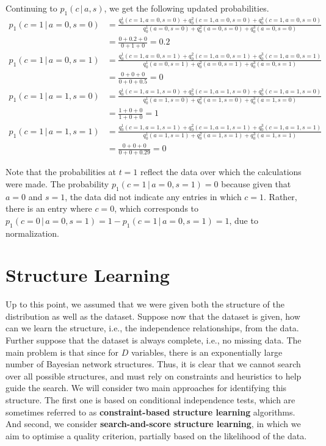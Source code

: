\documentclass{article}
\newcommand{\giv}{\,|\,}
\begin{document}
\noindent Continuing to $p_1(c \giv a, s)$, we get the following updated probabilities. 
\begin{align*}
    p_1(c=1 \giv a=0, s=0) &= \frac{q_0^1(c=1, a=0, s=0) + q_0^2(c=1, a=0, s=0) + q_0^3(c=1, a=0, s=0)}{q_0^1(a=0, s=0) + q_0^2(a=0, s=0) + q_0^3(a=0, s=0)}\\[1em] 
    &= \frac{0 + 0.2 + 0}{0 + 1 + 0} = 0.2\\[1em]
    p_1(c=1 \giv a=0, s=1) &= \frac{q_0^1(c=1, a=0, s=1) + q_0^2(c=1, a=0, s=1) + q_0^3(c=1, a=0, s=1)}{q_0^1(a=0, s=1) + q_0^2(a=0, s=1) + q_0^3(a=0, s=1)}\\[1em] 
    &= \frac{0 + 0 + 0}{0 + 0 + 0.5} = 0\\[1em]
    p_1(c=1 \giv a=1, s=0) &= \frac{q_0^1(c=1, a=1, s=0) + q_0^2(c=1, a=1, s=0) + q_0^3(c=1, a=1, s=0)}{q_0^1(a=1, s=0) + q_0^2(a=1, s=0) + q_0^3(a=1, s=0)}\\[1em] 
    &= \frac{1 + 0 + 0}{1 + 0 + 0} = 1\\[1em]
    p_1(c=1 \giv a=1, s=1) &= \frac{q_0^1(c=1, a=1, s=1) + q_0^2(c=1, a=1, s=1) + q_0^3(c=1, a=1, s=1)}{q_0^1(a=1, s=1) + q_0^2(a=1, s=1) + q_0^3(a=1, s=1)}\\[1em] 
    &= \frac{0 + 0 + 0}{0 + 0 + 0.29} = 0 
\end{align*}

\noindent Note that the probabilities at $t=1$ reflect the data over which the calculations were made. The probability $p_1(c=1 \giv a=0, s=1) = 0$ because given that $a=0$ and $s=1$, the data did not indicate any entries in which $c=1$. Rather, there is an entry where $c=0$, which corresponds to $p_1(c=0 \giv a=0, s=1) = 1 - p_1(c=1 \giv a=0, s=1) = 1$, due to normalization. 

\newpage
\section{Structure Learning}

Up to this point, we assumed that we were given both the structure of the distribution as well as the dataset. Suppose now that the dataset is given, how can we learn the structure, i.e., the independence relationships, from the data. Further suppose that the dataset is always complete, i.e., no missing data. The main problem is that since for $D$ variables, there is an exponentially large number of Bayesian network structures. Thus, it is clear that we cannot search over all possible structures, and must rely on constraints and heuristics to help guide the search. We will consider two main approaches for identifying this structure. The first one is based on conditional independence tests, which are sometimes referred to as \textbf{constraint-based structure learning} algorithms. And second, we consider \textbf{search-and-score structure learning}, in which we aim to optimise a quality criterion, partially based on the likelihood of the data. 
\end{document}
